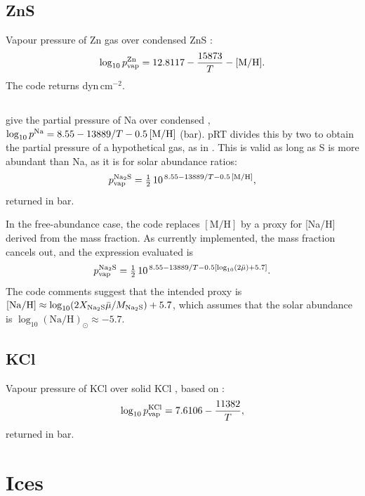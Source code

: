 \documentclass[11pt,a4paper]{article}
\newcommand{\pvap}{p_{\rm vap}}
\newcommand{\MH}{[\mathrm{M/H}]}
\newcommand{\chem}[1]{\mathrm{#1}}
\begin{document}
\subsection{ZnS}
Vapour pressure of Zn gas over condensed ZnS
\citep[][Eq.~15, from \citealt{visscher2006}]{morley2012}:
\begin{equation}
  \log_{10} \pvap^{\rm Zn} = 12.8117 - \frac{15873}{T} - \MH .
\end{equation}
The code returns dyn\,cm$^{-2}$.

\subsection{\texorpdfstring{\chem{Na_2S}}{Na2S}}
\citet[][Eq.~12, from \citealt{visscher2006}]{morley2012} give the partial
pressure of Na over condensed \chem{Na_2S},
$\log_{10} p^{\rm Na} = 8.55 - 13889/T - 0.5\,\MH$ (bar). pRT divides this by
two to obtain the partial pressure of a hypothetical \chem{Na_2S} gas, as in
\citet{charnay2018}. This is valid as long as S is more abundant than Na,
as it is for solar abundance ratios:
\begin{equation}
  \pvap^{\rm Na_2S} = \tfrac{1}{2}\,10^{\,8.55 - 13889/T - 0.5\,\MH} ,
\end{equation}
returned in bar.

In the free-abundance case, the code replaces $\MH$ by a proxy for [Na/H]
derived from the mass fraction. As currently implemented, the mass fraction
cancels out, and the expression evaluated is
\begin{equation}
  \pvap^{\rm Na_2S} = \tfrac{1}{2}\,
  10^{\,8.55 - 13889/T - 0.5\left[\log_{10}(2\bar{\mu}) + 5.7\right]} .
\end{equation}
The code comments suggest that the intended proxy is
$[\mathrm{Na/H}] \approx \log_{10}(2X_{\rm Na_2S}\bar{\mu}/M_{\rm Na_2S}) + 5.7$,
which assumes that the solar abundance is $\log_{10}(\mathrm{Na/H})_\odot \approx -5.7$.

\subsection{KCl}
Vapour pressure of KCl over solid KCl \citep[][Eq.~18]{morley2012}, based
on \citet{lodders1999}:
\begin{equation}
  \log_{10} \pvap^{\rm KCl} = 7.6106 - \frac{11382}{T} ,
\end{equation}
returned in bar.

\section{Ices}
\end{document}
